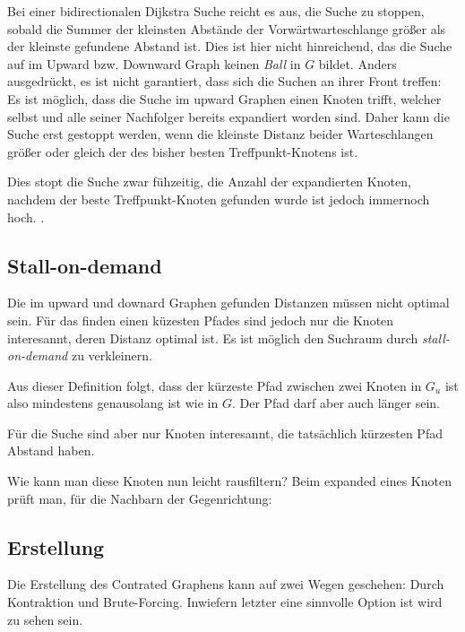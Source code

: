 Bei einer bidirectionalen Dijkstra Suche reicht es aus, die Suche zu stoppen, sobald die Summer der kleinsten Abstände der Vorwärtwarteschlange größer als der kleinste gefundene Abstand ist.
Dies ist hier nicht hinreichend, das die Suche auf im Upward bzw. Downward Graph keinen \emph{Ball} in $G$ bildet.
Anders ausgedrückt, es ist nicht garantiert, dass sich die Suchen an ihrer Front treffen:
Es ist möglich, dass die Suche im upward Graphen einen Knoten trifft, welcher selbst und alle seiner Nachfolger bereits expandiert worden sind.
Daher kann die Suche erst gestoppt werden, wenn die kleinste Distanz beider Warteschlangen größer oder gleich der des bisher besten Treffpunkt-Knotens ist.

Dies stopt die Suche zwar fühzeitig, die Anzahl der expandierten Knoten, nachdem der beste Treffpunkt-Knoten gefunden wurde ist jedoch immernoch hoch.
.

\subsection{Stall-on-demand}

Die im upward und downard Graphen gefunden Distanzen müssen nicht optimal sein.
Für das finden einen küzesten Pfades sind jedoch nur die Knoten interesannt, deren Distanz optimal ist.
Es ist möglich den Suchraum durch \emph{stall-on-demand} zu verkleinern.


Aus dieser Definition folgt, dass der kürzeste Pfad zwischen zwei Knoten in $G_u$ ist also mindestens genausolang ist wie in $G$.
Der Pfad darf aber auch länger sein.


Für die Suche sind aber nur Knoten interesannt, die tatsächlich kürzesten Pfad Abstand haben.

Wie kann man diese Knoten nun leicht rausfiltern?
Beim expanded eines Knoten prüft man, für die Nachbarn der Gegenrichtung:


\subsection{Erstellung}

Die Erstellung des Contrated Graphens kann auf zwei Wegen geschehen: Durch Kontraktion und Brute-Forcing.
Inwiefern letzter eine sinnvolle Option ist wird  zu sehen sein.

